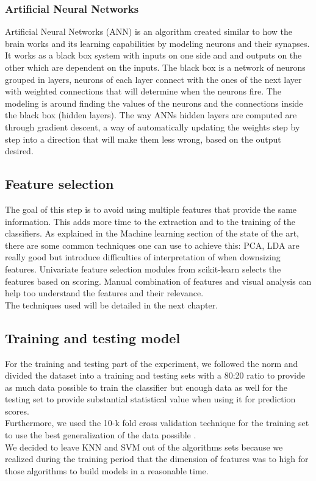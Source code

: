 \subsubsection{Artificial Neural Networks}
Artificial Neural Networks (ANN) is an algorithm created similar to how the brain works and its learning capabilities by modeling neurons and their synapses. It works as a black box system with inputs on one side and and outputs on the other which are dependent on the inputs. The black box is a network of neurons grouped in layers, neurons of each layer connect with the ones of the next layer with weighted connections that will determine when the neurons fire. The modeling is around finding the values of the neurons and the connections inside the black box (hidden layers). The way ANNs hidden layers are computed are through gradient descent, a way of automatically updating the weights step by step into a direction that will make them less wrong, based on the output desired\cite{ann}.

\subsection{Feature selection}
The goal of this step is to avoid using multiple features that provide the same information. This adds more time to the extraction and to the training of the classifiers. As explained in the Machine learning section of the state of the art, there are some common techniques one can use to achieve this: PCA, LDA are really good but introduce difficulties of interpretation of when downsizing features. Univariate feature selection modules from scikit-learn selects the features based on scoring. Manual combination of features and visual analysis can help too understand the features and their relevance.\\
The techniques used will be detailed in the next chapter.

\subsection{Training and testing model}
For the training and testing part of the experiment, we followed the norm and divided the dataset into  a training and testing sets with a 80:20 ratio to provide as much data possible to train the classifier but enough data as well for the testing set to provide substantial statistical value when using it for prediction scores.\\
Furthermore, we used the 10-k fold cross validation technique for the training set to use the best generalization of the data possible \cite{fitting}.\\
We decided to leave KNN and SVM out of the algorithms sets because we realized during the training period that the dimension of features was to high for those algorithms to build models in a reasonable time.
